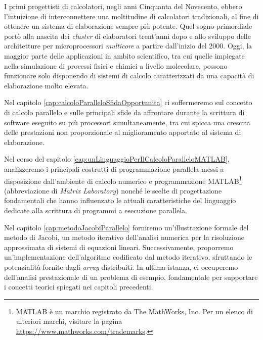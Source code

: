 I primi progettisti di calcolatori, negli anni Cinquanta del Novecento, ebbero l'intuizione di interconnettere
una moltitudine di calcolatori tradizionali, al fine di ottenere un sistema di elaborazione sempre più potente.
Quel sogno primordiale port\`o alla nascita dei \textit{cluster} di elaboratori trent'anni dopo e allo sviluppo delle architetture per microprocessori
\textit{multicore} a partire dall'inizio del 2000.\newline
Oggi, la maggior parte delle applicazioni in ambito scientifico, tra cui quelle impiegate nella simulazione di processi fisici e chimici a livello molecolare, possono funzionare solo disponendo di sistemi di calcolo caratterizzati da una capacit\`a di elaborazione molto elevata.

Nel capitolo \ref{cap:calcoloParalleloSfidaOpportunita} ci soffermeremo sul concetto di calcolo parallelo e sulle principali sfide da affrontare
durante la scrittura di software eseguito su pi\`u processori simultaneamente, tra cui spicca una crescita delle prestazioni non proporzionale
al miglioramento apportato al sistema di elaborazione.

Nel corso del capitolo \ref{cap:unLinguaggioPerIlCalcoloParalleloMATLAB}, analizzeremo i principali costrutti di programmazione parallela messi a disposizione dall’ambiente di calcolo numerico
e programmazione MATLAB\textsuperscript{\textregistered}\footnote{MATLAB \`e un marchio registrato da The MathWorks, Inc. Per un elenco di ulteriori marchi, visitare la pagina \url{https://www.mathworks.com/trademarks}.} (abbreviazione di \textit{Matrix Laboratory}) nonch\'e le scelte di progettazione fondamentali che hanno influenzato
le attuali caratteristiche del linguaggio dedicate alla scrittura di programmi a esecuzione parallela.

Nel capitolo \ref{cap:metodoJacobiParallelo} forniremo un'illustrazione formale del metodo di Jacobi, un metodo iterativo dell’analisi numerica per la risoluzione
approssimata di sistemi di equazioni lineari. Successivamente, proporremo un’implementazione dell'algoritmo codificato dal metodo iterativo, sfruttando le potenzialità fornite
dagli \textit{array} distribuiti. In ultima istanza, ci occuperemo dell’analisi prestazionale di un problema di esempio, fondamentale per supportare i concetti teorici spiegati nei capitoli precedenti.
